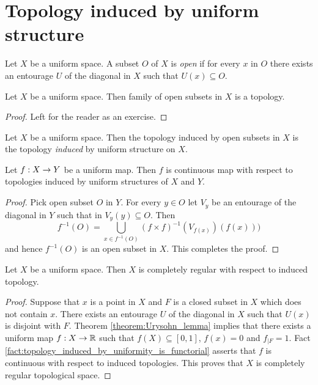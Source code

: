 \section{Topology induced by uniform structure}

\begin{definition}
	Let $X$ be a uniform space. A subset $O$ of $X$ is \textit{open} if for every $x$ in $O$ there exists an entourage $U$ of the diagonal in $X$ such that $U(x) \subseteq O$.
\end{definition}

\begin{fact}\label{fact:topology_induced_by_uniform_structure}
	Let $X$ be a uniform space. Then family of open subsets in $X$ is a topology.
\end{fact}
\begin{proof}
	Left for the reader as an exercise.
\end{proof}

\begin{definition}
	Let $X$ be a uniform space. Then the topology induced by open subsets in $X$ is the topology \textit{induced} by uniform structure on $X$.
\end{definition}

\begin{fact}\label{fact:topology_induced_by_uniformity_is_functorial}
	Let $f:X \rightarrow Y$ be a uniform map. Then $f$ is continuous map with respect to topologies induced by uniform structures of $X$ and $Y$.
\end{fact}
\begin{proof}
	Pick open subset $O$ in $Y$. For every $y \in O$ let $V_y$ be an entourage of the diagonal in $Y$ such that in $V_y(y) \subseteq O$. Then
	$$f^{-1}(O) = \bigcup_{x \in f^{-1}(O)}\left(f\times f\right)^{-1}(V_{f(x)})\left(f(x)\right))$$
	and hence $f^{-1}(O)$ is an open subset in $X$. This completes the proof.
\end{proof}

\begin{corollary}\label{corollary:uniform_spaces_are_completely_regular}
	Let $X$ be a uniform space. Then $X$ is completely regular with respect to induced topology.
\end{corollary}
\begin{proof}
	Suppose that $x$ is a point in $X$ and $F$ is a closed subset in $X$ which does not contain $x$. There exists an entourage $U$ of the diagonal in $X$ such that $U(x)$ is disjoint with $F$. Theorem \ref{theorem:Urysohn_lemma} implies that there exists a uniform map $f:X\rightarrow {\mathbb R}$ such that $f(X) \subseteq [0,1]$, $f(x) = 0$ and $f_{\mid F} = 1$. Fact \ref{fact:topology_induced_by_uniformity_is_functorial} asserts that $f$ is continuous with respect to induced topologies. This proves that $X$ is completely regular topological space.
\end{proof}

